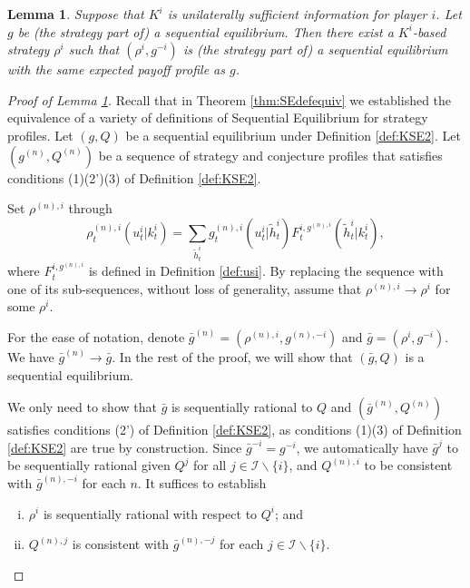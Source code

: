 \documentclass[pdflatex,sn-basic]{sn-jnl}
\newcommand{\Qfunc}{Q}
\newcommand{\Comp}{K}
\newcommand{\comp}{k}
\theoremstyle{thmstyleone}%
\newtheorem{lemma}{Lemma}
\theoremstyle{thmstyletwo}%
\theoremstyle{thmstylethree}%
\begin{document}
\begin{appendices}
\begin{lemma}\label{lem:usisereplace}
	Suppose that $\Comp^i$ is unilaterally sufficient information for player $i$. Let $g$ be (the strategy part of) a sequential equilibrium. Then there exist a $\Comp^i$-based strategy $\rho^i$ such that $(\rho^i, g^{-i})$ is (the strategy part of) a sequential equilibrium with the same expected payoff profile as $g$. 
\end{lemma}

\begin{proof}[Proof of Lemma \ref{lem:usisereplace}]
	  {Recall that in Theorem \ref{thm:SEdefequiv} we established the equivalence of a variety of definitions of Sequential Equilibrium for strategy profiles.} Let $(g, \Qfunc)$ be a sequential equilibrium under Definition \ref{def:KSE2}. Let $(g^{(n)}, \Qfunc^{(n)})$ be a sequence of strategy and conjecture profiles that satisfies conditions (1)(2')(3) of Definition \ref{def:KSE2}.
	
	Set $\rho^{(n), i}$ through
	\begin{equation}\label{rhotheultimateequivalentstrategy2}
		\rho_t^{(n), i}(u_t^i|\comp_t^i) = \sum_{\tilde{h}_t^i}g_t^{(n), i}(u_t^i|\tilde{h}_t^i)F_t^{i, g^{(n), i}}(\tilde{h}_t^i|\comp_t^i),
	\end{equation}
	where $F_t^{i, g^{(n), i}}$ is defined in Definition \ref{def:usi}.
	By replacing the sequence with one of its sub-sequences, without loss of generality, assume that $\rho^{(n), i} \rightarrow \rho^i$ for some $\rho^i$.
	
	  {For the ease of notation,} denote $\bar{g}^{(n)} = (\rho^{(n), i}, g^{(n), -i})$ and $\bar{g} = (\rho^i, g^{-i})$. We have $\bar{g}^{(n)}\rightarrow \bar{g}$. 
	  {In the rest of the proof, we will} show that $(\bar{g}, \Qfunc)$ is a sequential equilibrium. 
 
	We only need to show that $\bar{g}$ is sequentially rational to $\Qfunc$ and $(\bar{g}^{(n)}, \Qfunc^{(n)})$ satisfies conditions (2') of Definition \ref{def:KSE2},
	as conditions (1)(3) of Definition \ref{def:KSE2} are {true by construction}. Since $\bar{g}^{-i} = g^{-i}$, we automatically have $\bar{g}^{j}$ to be sequentially rational given $\Qfunc^{j}$ for all $j\in\mathcal{I}\backslash\{i\}$, and $\Qfunc^{(n), i}$ to be consistent with $\bar{g}^{(n), -i}$ for each $n$. It suffices to establish 
	\begin{enumerate}[(i)]
		\item $\rho^i$ is sequentially rational with respect to $\Qfunc^{i}$; and 
		\item $\Qfunc^{(n), j}$ is consistent with $\bar{g}^{(n), -j}$ for each $j\in\mathcal{I}\backslash\{i\}$.
	\end{enumerate}
	

\end{proof}
\end{appendices}
\end{document}
